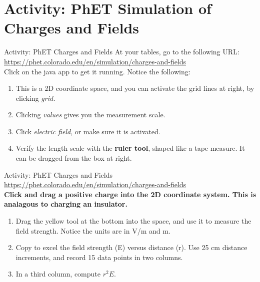 \documentclass{beamer}
\begin{document}
\section{Activity: PhET Simulation of Charges and Fields}

\begin{frame}{Activity: PhET Charges and Fields}
At your tables, go to the following URL: \\ \vspace{0.2cm}
\url{https://phet.colorado.edu/en/simulation/charges-and-fields} \\ \vspace{0.2cm}
Click on the java app to get it running.  Notice the following:
\begin{enumerate}
\item This is a 2D coordinate space, and you can activate the grid lines at right, by clicking \textit{grid.}
\item Clicking \textit{values} gives you the measurement scale.
\item Click \textit{electric field}, or make sure it is activated.
\item Verify the length scale with the \textbf{ruler tool}, shaped like a tape measure.  It can be dragged from the box at right.
\end{enumerate}
\end{frame}

\begin{frame}{Activity: PhET Charges and Fields}
\small
\url{https://phet.colorado.edu/en/simulation/charges-and-fields} \\ \vspace{0.2cm}
\textbf{Click and drag a positive charge into the 2D coordinate system.  This is analagous to charging an insulator.}
\begin{enumerate}
\item Drag the yellow tool at the bottom into the space, and use it to measure the field strength.  Notice the units are in V/m and m.
\item Copy to excel the field strength (E) versus distance (r).  Use 25 cm distance increments, and record 15 data points in two columns.
\item In a third column, compute $r^2 E$.
\end{enumerate}
\end{frame}
\end{document}
